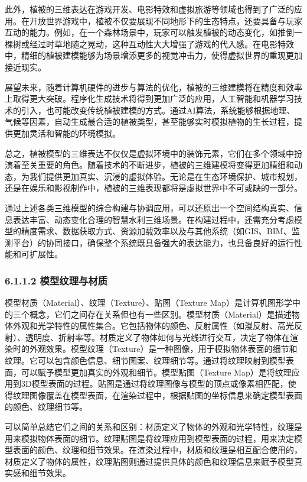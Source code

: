 此外，植被的三维表达在游戏开发、电影特效和虚拟旅游等领域也得到了广泛的应用。在开放世界游戏中，植被不仅要展现不同地形下的生态特点，还要具备与玩家互动的能力。例如，在一个森林场景中，玩家可以触发植被的动态变化，如推倒一棵树或经过时草地随之晃动，这种互动性大大增强了游戏的代入感。在电影特效中，精细的植被建模能够为场景增添更多的视觉冲击力，使得虚拟世界的重现更加接近现实。

展望未来，随着计算机硬件的进步与算法的优化，植被的三维建模将在精度和效率上取得更大突破。程序化生成技术将得到更加广泛的应用，人工智能和机器学习技术的引入，也可能改变传统植被建模的方式。通过AI算法，系统能够根据地理、气候等因素，自动生成最合适的植被类型，甚至能够实时模拟植物的生长过程，提供更加灵活和智能的环境模拟。

总之，植被模型的三维表达不仅仅是虚拟环境中的装饰元素，它们在多个领域中扮演着至关重要的角色。随着技术的不断进步，植被的三维建模将变得更加精细和动态，为我们提供更加真实、沉浸的虚拟体验。无论是在生态环境保护、城市规划，还是在娱乐和影视制作中，植被的三维表现都将是虚拟世界中不可或缺的一部分。

通过上述各类三维模型的综合构建与协调应用，可以还原出一个空间结构真实、信息表达丰富、动态变化合理的智慧水利三维场景。在构建过程中，还需充分考虑模型的精度需求、数据获取方式、资源加载效率以及与其他系统（如GIS、BIM、监测平台）的协同接口，确保整个系统既具备强大的表达能力，也具备良好的运行性能和可扩展性。

\subsubsection{6.1.1.2
模型纹理与材质}\label{ux6a21ux578bux7eb9ux7406ux4e0eux6750ux8d28}

模型材质（Material）、纹理（Texture）、贴图（Texture
Map）是计算机图形学中的三个概念，它们之间存在关系但也有一些区别。模型材质（Material）是描述物体外观和光学特性的属性集合。它包括物体的颜色、反射属性（如漫反射、高光反射）、透明度、折射率等。材质定义了物体如何与光线进行交互，决定了物体在渲染时的外观效果。模型纹理（Texture）是一种图像，用于模拟物体表面的细节和纹理。它可以包含颜色信息、细节图案、纹理细节等。通过将纹理映射到模型表面，可以赋予模型更加真实的外观和细节。模型贴图（Texture
Map）是将纹理应用到3D模型表面的过程。贴图是通过将纹理图像与模型的顶点或像素相匹配，使得纹理图像覆盖在模型表面，在渲染过程中，根据贴图的坐标信息来确定模型表面的颜色、纹理细节等。

可以简单总结它们之间的关系和区别：材质定义了物体的外观和光学特性，纹理是用来模拟物体表面的细节。纹理贴图是将纹理应用到模型表面的过程，用来决定模型表面的颜色、纹理和细节效果。在渲染过程中，材质和纹理是相互配合使用的，材质定义了物体的属性，纹理贴图则通过提供具体的颜色和纹理信息来赋予模型真实感和细节效果。

